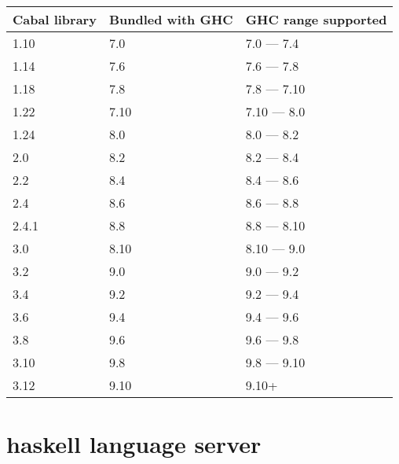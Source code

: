 \documentclass[openany, 12pt]{book}
\begin{document}
\begin{table}[h]
	\centering
	\begin{tabular}{lll}
		\toprule
		{Cabal library} & {Bundled with GHC} & {GHC range supported} \\
		\midrule
		1.10            & 7.0                & 7.0 --- 7.4           \\
		1.14            & 7.6                & 7.6 --- 7.8           \\
		1.18            & 7.8                & 7.8 --- 7.10          \\
		1.22            & 7.10               & 7.10 --- 8.0          \\
		1.24            & 8.0                & 8.0 --- 8.2           \\
		2.0             & 8.2                & 8.2 --- 8.4           \\
		2.2             & 8.4                & 8.4 --- 8.6           \\
		2.4             & 8.6                & 8.6 --- 8.8           \\
		2.4.1           & 8.8                & 8.8 --- 8.10          \\
		3.0             & 8.10               & 8.10 --- 9.0          \\
		3.2             & 9.0                & 9.0 --- 9.2           \\
		3.4             & 9.2                & 9.2 --- 9.4           \\
		3.6             & 9.4                & 9.4 --- 9.6           \\
		3.8             & 9.6                & 9.6 --- 9.8           \\
		3.10            & 9.8                & 9.8 --- 9.10          \\
		3.12            & 9.10               & 9.10+                 \\
		\bottomrule
	\end{tabular}
	\caption{}
\end{table}

\chapter{haskell language server}
\end{document}
